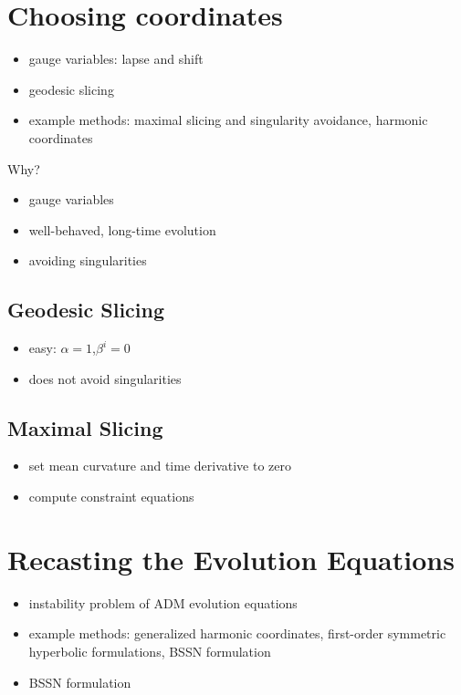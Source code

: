 \documentclass[twocolumn]{article}
\begin{document}
  \section{Choosing coordinates} %
  \label{sec:choosing_coordinates}
    \begin{itemize}
      \item gauge variables: lapse and shift
      \item geodesic slicing
      \item example methods: maximal slicing and singularity avoidance, harmonic coordinates
    \end{itemize}

    Why?
    \begin{itemize}
      \item gauge variables
      \item well-behaved, long-time evolution
      \item avoiding singularities
    \end{itemize}

    \subsection{Geodesic Slicing} %
    \label{sub:geodesic_slicing}
      \begin{itemize}
        \item easy: $α=1$,$β^i=0$
        \item does not avoid singularities
      \end{itemize}

    \subsection{Maximal Slicing} %
    \label{sub:maximal_slicing}
      \begin{itemize}
        \item set mean curvature and time derivative to zero
        \item compute constraint equations
      \end{itemize}

  \section{Recasting the Evolution Equations} %
  \label{sec:recasting_the_evolution_equations}
    \begin{itemize}
      \item instability problem of ADM evolution equations
      \item example methods: generalized harmonic coordinates, first-order symmetric hyperbolic formulations, BSSN formulation
      \item BSSN formulation
    \end{itemize}
\end{document}
